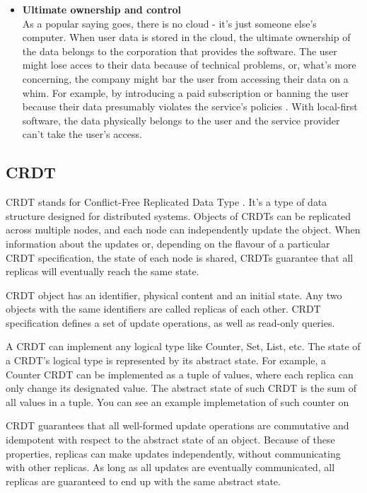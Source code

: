 \documentclass[a4paper, 11pt, oneside]{article}
\theoremstyle{definition}
\begin{document}
\begin{itemize}
    \item \textbf{Ultimate ownership and control} \\
    As a popular saying goes, there is no cloud - it's just someone else's computer. When user data is stored in the cloud, the ultimate ownership of the data belongs to the corporation that provides the software. The user might lose acces to their data because of technical problems, or, what's more concerning, the company might bar the user from accessing their data on a whim. For example, by introducing a paid subscription or banning the user because their data presumably violates the service's policies \cite{googleblock}. With local-first software, the data physically belongs to the user and the service provider can't take the user's access.
\end{itemize}

\subsection{CRDT}
CRDT stands for Conflict-Free Replicated Data Type \cite{crdt}. It's a type of data structure designed for distributed systems. Objects of CRDTs can be replicated across multiple nodes, and each node can independently update the object. When information about the updates or, depending on the flavour of a particular CRDT specification, the state of each node is shared, CRDTs guarantee that all replicas will eventually reach the same state.

CRDT object has an identifier, physical content and an initial state. Any two objects with the same identifiers are called replicas of each other. CRDT specification defines a set of update operations, as well as read-only queries.

A CRDT can implement any logical type like Counter, Set, List, etc. The state of a CRDT's logical type is represented by its abstract state. For example, a Counter CRDT can be implemented as a tuple of values, where each replica can only change its designated value. The abstract state of such CRDT is the sum of all values in a tuple. You can see an example implemetation of such counter on 

CRDT guarantees that all well-formed update operations are commutative and idempotent with respect to the abstract state of an object. Because of these properties, replicas can make updates independently, without communicating with other replicas. As long as all updates are eventually communicated, all replicas are guaranteed to end up with the same abstract state.
\end{document}
